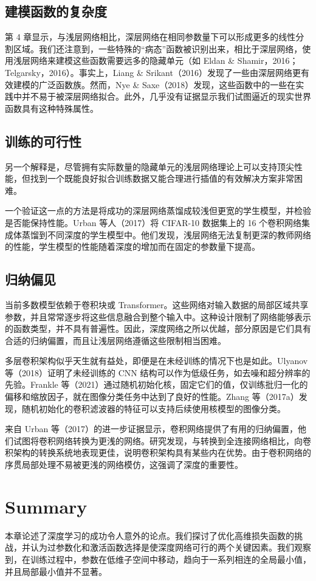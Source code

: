 \documentclass[lang=cn,newtx,10pt,scheme=chinese]{elegantbook}
\begin{document}
\subsection{建模函数的复杂度}
第 4 章显示，与浅层网络相比，深层网络在相同参数量下可以形成更多的线性分割区域。我们还注意到，一些特殊的“病态”函数被识别出来，相比于深层网络，使用浅层网络来建模这些函数需要远多的隐藏单元（如 Eldan \& Shamir，2016；Telgarsky，2016）。事实上，Liang \& Srikant（2016）发现了一些由深层网络更有效建模的广泛函数族。然而，Nye \& Saxe（2018）发现，这些函数中的一些在实践中并不易于被深层网络拟合。此外，几乎没有证据显示我们试图逼近的现实世界函数具有这种特殊属性。

\subsection{训练的可行性}
另一个解释是，尽管拥有实际数量的隐藏单元的浅层网络理论上可以支持顶尖性能，但找到一个既能良好拟合训练数据又能合理进行插值的有效解决方案非常困难。

一个验证这一点的方法是将成功的深层网络蒸馏成较浅但更宽的学生模型，并检验是否能保持性能。Urban 等人（2017）将 CIFAR-10 数据集上的 16 个卷积网络集成体蒸馏到不同深度的学生模型中。他们发现，浅层网络无法复制更深的教师网络的性能，学生模型的性能随着深度的增加而在固定的参数量下提高。

\subsection{归纳偏见}
当前多数模型依赖于卷积块或 Transformer。这些网络对输入数据的局部区域共享参数，并且常常逐步将这些信息融合到整个输入中。这种设计限制了网络能够表示的函数类型，并不具有普遍性。因此，深度网络之所以优越，部分原因是它们具有合适的归纳偏置，而且让浅层网络遵循这些限制相当困难。

多层卷积架构似乎天生就有益处，即便是在未经训练的情况下也是如此。Ulyanov 等（2018）证明了未经训练的 CNN 结构可以作为低级任务，如去噪和超分辨率的先验。Frankle 等（2021）通过随机初始化核，固定它们的值，仅训练批归一化的偏移和缩放因子，就在图像分类任务中达到了良好的性能。Zhang 等（2017a）发现，随机初始化的卷积滤波器的特征可以支持后续使用核模型的图像分类。

来自 Urban 等（2017）的进一步证据显示，卷积网络提供了有用的归纳偏置，他们试图将卷积网络转换为更浅的网络。研究发现，与转换到全连接网络相比，向卷积架构的转换系统地表现更佳，说明卷积架构具有某些内在优势。由于卷积网络的序贯局部处理不易被更浅的网络模仿，这强调了深度的重要性。


\section{Summary}
本章论述了深度学习的成功令人意外的论点。我们探讨了优化高维损失函数的挑战，并认为过参数化和激活函数选择是使深度网络可行的两个关键因素。我们观察到，在训练过程中，参数在低维子空间中移动，趋向于一系列相连的全局最小值，并且局部最小值并不显著。
\end{document}
